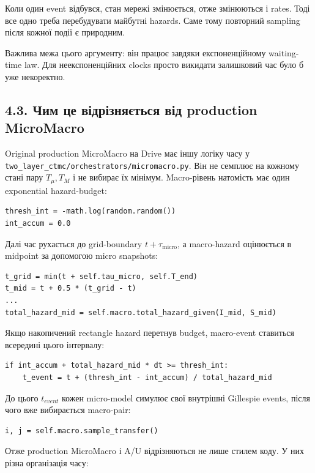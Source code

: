 \documentclass[11pt,a4paper]{article}
\begin{document}
Коли один event відбувся, стан мережі змінюється, отже змінюються і rates. Тоді все одно треба перебудувати майбутні hazards. Саме тому повторний sampling після кожної події є природним.

Важлива межа цього аргументу: він працює завдяки експоненційному waiting-time law. Для неекспоненційних clocks просто викидати залишковий час було б уже некоректно.

\subsection*{4.3. Чим це відрізняється від production MicroMacro}

Original production MicroMacro на Drive має іншу логіку часу у
\texttt{two\_layer\_ctmc/orchestrators/micromacro.py}.
Він не семплює на кожному стані пару
\(T_{\mu},T_M\) і не вибирає їх мінімум.
Macro-рівень натомість має один exponential hazard-budget:

\begin{lstlisting}[style=pycode]
thresh_int = -math.log(random.random())
int_accum = 0.0
\end{lstlisting}

Далі час рухається до grid-boundary \(t+\tau_{\mathrm{micro}}\), а macro-hazard оцінюється в midpoint за допомогою micro snapshots:

\begin{lstlisting}[style=pycode]
t_grid = min(t + self.tau_micro, self.T_end)
t_mid = t + 0.5 * (t_grid - t)
...
total_hazard_mid = self.macro.total_hazard_given(I_mid, S_mid)
\end{lstlisting}

Якщо накопичений rectangle hazard перетнув budget, macro-event ставиться всередині цього інтервалу:

\begin{lstlisting}[style=pycode]
if int_accum + total_hazard_mid * dt >= thresh_int:
    t_event = t + (thresh_int - int_accum) / total_hazard_mid
\end{lstlisting}

До цього \(t_{event}\) кожен micro-model симулює свої внутрішні Gillespie events, після чого вже вибирається macro-pair:

\begin{lstlisting}[style=pycode]
i, j = self.macro.sample_transfer()
\end{lstlisting}

Отже production MicroMacro і A/U відрізняються не лише стилем коду. У них різна організація часу:
\end{document}
